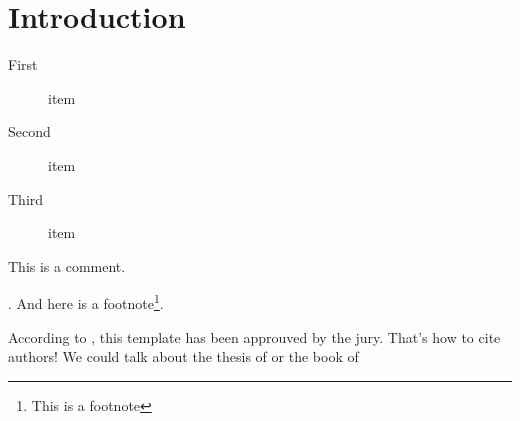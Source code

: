 \blankpage

\chapter*{Introduction}
\label{chap:introduction}

\lipsum[1]

\begin{description}
  \item [First] item
  \item [Second] item
  \item [Third] item
\end{description}

\lipsum[1]

\begin{remark}
  This is a comment.
\end{remark}

\lipsum[1]

\lipsum*[1]. And here is a footnote\footnote{This is a footnote}.

According to \cite{Karolus2019}, this template has been approuved by the jury. That's how to cite authors! We could talk about the thesis of \cite{Blue2011} or the book of \cite{Cat2012}


